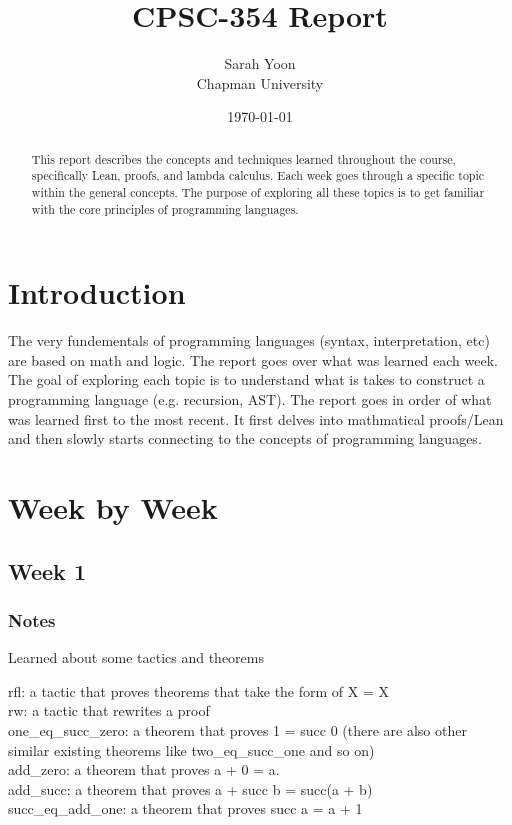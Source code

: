 \documentclass{article}
\title{CPSC-354 Report}
\author{Sarah Yoon  \\ Chapman University}
\date{\today}
\theoremstyle{theorem}
\theoremstyle{definition}
\theoremstyle{remark}
\begin{document}
\maketitle

\begin{abstract}
This report describes the concepts and techniques learned throughout the course, specifically Lean, proofs, and lambda calculus. 
Each week goes through a specific topic within the general concepts. The purpose of exploring all these topics is to get familiar 
with the core principles of programming languages. 

\end{abstract}

\setcounter{tocdepth}{3}
\tableofcontents

\section{Introduction}\label{intro}
The very fundementals of programming languages (syntax, interpretation, etc) are based on math and logic. The report goes over 
what was learned each week. The goal of exploring each topic is to understand what is takes to construct a programming language (e.g. recursion, AST).
The report goes in order of what was learned first to the most recent. It first delves into mathmatical proofs/Lean and then slowly starts connecting 
to the concepts of programming languages. 
\section{Week by Week}\label{homework}

\subsection{Week 1}

\subsubsection*{Notes}
Learned about some tactics and theorems

rfl: a tactic that proves theorems that take the form of X = X \\
rw: a tactic that rewrites a proof\\
one\_eq\_succ\_zero: a theorem that proves 1 = succ 0 (there are also other similar existing theorems like two\_eq\_succ\_one and so on)\\
add\_zero: a theorem that proves a + 0 = a.\\
add\_succ: a theorem that proves a + succ b = succ(a + b)\\
succ\_eq\_add\_one: a theorem that proves succ a = a + 1\\
\end{document}
